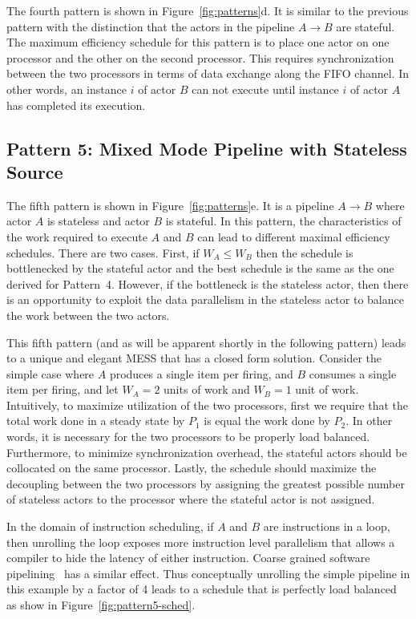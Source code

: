 The fourth pattern is shown in Figure~\ref{fig:patterns}d. It is
similar to the previous pattern with the distinction that the actors
in the pipeline $A\rightarrow B$ are stateful. The maximum efficiency
schedule for this pattern is to place one actor on one processor and
the other on the second processor. This requires synchronization
between the two processors in terms of data exchange along the FIFO
channel. In other words, an instance $i$ of actor $B$ can not execute
until instance $i$ of actor $A$ has completed its execution.  

\subsection{Pattern 5: Mixed Mode Pipeline with Stateless Source}

The fifth pattern is shown in Figure~\ref{fig:patterns}e. It is a
pipeline $A\rightarrow B$ where actor $A$ is stateless and actor $B$
is stateful. In this pattern, the characteristics of the work required
to execute $A$ and $B$ can lead to different maximal efficiency
schedules.  There are two cases. First, if $W_A \le W_B$ then the
schedule is bottlenecked by the stateful actor and the best schedule
is the same as the one derived for Pattern~4. However, if the
bottleneck is the stateless actor, then there is an opportunity to
exploit the data parallelism in the stateless actor to balance the
work between the two actors.

This fifth pattern (and as will be apparent shortly in the following
pattern) leads to a unique and elegant MESS that has a closed form
solution. Consider the simple case where $A$ produces a single item
per firing, and $B$ consumes a single item per firing, and let $W_A =
2$ units of work and $W_B = 1$ unit of work. Intuitively, to maximize
utilization of the two processors, first we require that the total
work done in a steady state by $P_1$ is equal the work done by
$P_2$. In other words, it is necessary for the two processors to be
properly load balanced. Furthermore, to minimize synchronization
overhead, the stateful actors should be collocated on the same
processor. Lastly, the schedule should maximize the decoupling between
the two processors by assigning the greatest possible number of
stateless actors to the processor where the stateful actor is not
assigned.

In the domain of instruction scheduling, if $A$ and $B$ are
instructions in a loop, then unrolling the loop exposes more
instruction level parallelism that allows a compiler to hide the
latency of either instruction. Coarse grained software
pipelining~\cite{mgordon-aplos06} has a similar effect. Thus
conceptually unrolling the simple pipeline in this example by a factor
of 4 leads to a schedule that is perfectly load balanced as show in
Figure~\ref{fig:pattern5-sched}. 

